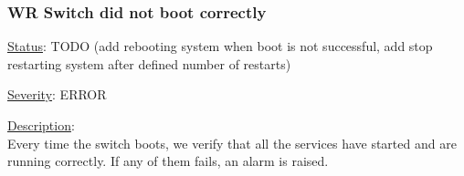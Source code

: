 \subsubsection{\bf WR Switch did not boot correctly}
		\label{fail:other:boot}
		\begin{pck_descr}
			\item [] \underline{Status}: TODO (add rebooting system when boot is
				 not successful, add stop restarting system after defined number of restarts)
			\item [] \underline{Severity}: ERROR
			\item [] \underline{Description}:\\
				Every time the switch boots, we verify that all the services have
				started and are running correctly. If any of them fails, an alarm is
				raised.


\end{pck_descr}
